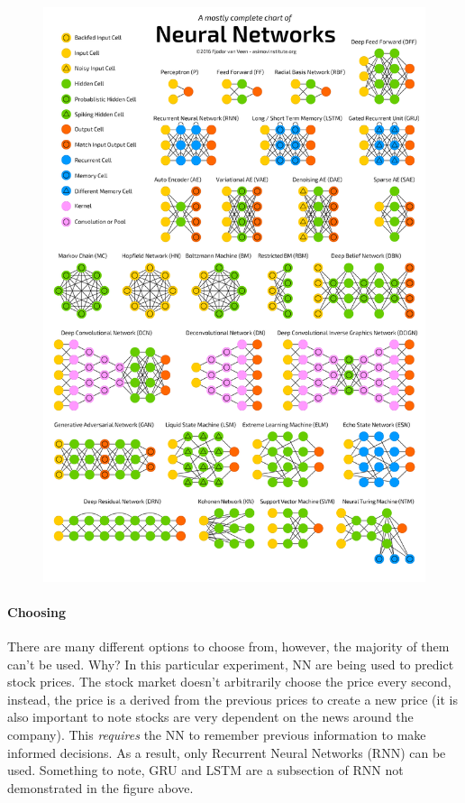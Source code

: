 \documentclass[12pt]{article}
\begin{document}
\begin{figure}[H]
  \includegraphics[width=\linewidth]{images/DifferentNN.png}
\end{figure}

\paragraph{Choosing}
There are many different options to choose from, however, the majority of them can't be used. Why? In this particular experiment, NN are being used to predict stock prices. The stock market doesn't arbitrarily choose the price every second, instead, the price is a derived from the previous prices to create a new price (it is also important to note stocks are very dependent on the news around the company). This \textit{requires} the NN to remember previous information to make informed decisions. As a result, only Recurrent Neural Networks (RNN) can be used. Something to note, GRU and LSTM are a subsection of RNN not demonstrated in the figure above.   
\end{document}
